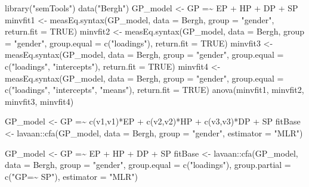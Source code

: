 \documentclass[
]{book}
\newenvironment{Shaded}{\begin{snugshade}}{\end{snugshade}}
\newcommand{\AttributeTok}[1]{\textcolor[rgb]{0.77,0.63,0.00}{#1}}
\newcommand{\ConstantTok}[1]{\textcolor[rgb]{0.00,0.00,0.00}{#1}}
\newcommand{\FunctionTok}[1]{\textcolor[rgb]{0.00,0.00,0.00}{#1}}
\newcommand{\NormalTok}[1]{#1}
\newcommand{\OtherTok}[1]{\textcolor[rgb]{0.56,0.35,0.01}{#1}}
\newcommand{\SpecialCharTok}[1]{\textcolor[rgb]{0.00,0.00,0.00}{#1}}
\newcommand{\StringTok}[1]{\textcolor[rgb]{0.31,0.60,0.02}{#1}}
\begin{document}
\begin{Shaded}
\begin{Highlighting}[]
\FunctionTok{library}\NormalTok{(}\StringTok{"semTools"}\NormalTok{)}
\FunctionTok{data}\NormalTok{(}\StringTok{"Bergh"}\NormalTok{)}
\NormalTok{GP\_model }\OtherTok{\textless{}{-}} \StringTok{\textquotesingle{}GP =\textasciitilde{} EP + HP + DP + SP\textquotesingle{}}
\NormalTok{minvfit1 }\OtherTok{\textless{}{-}} \FunctionTok{measEq.syntax}\NormalTok{(GP\_model, }\AttributeTok{data =}\NormalTok{ Bergh, }\AttributeTok{group =} \StringTok{"gender"}\NormalTok{, }\AttributeTok{return.fit =} \ConstantTok{TRUE}\NormalTok{)}
\NormalTok{minvfit2 }\OtherTok{\textless{}{-}} \FunctionTok{measEq.syntax}\NormalTok{(GP\_model, }\AttributeTok{data =}\NormalTok{ Bergh, }\AttributeTok{group =} \StringTok{"gender"}\NormalTok{, }
                          \AttributeTok{group.equal =} \FunctionTok{c}\NormalTok{(}\StringTok{"loadings"}\NormalTok{), }\AttributeTok{return.fit =} \ConstantTok{TRUE}\NormalTok{)}
\NormalTok{minvfit3 }\OtherTok{\textless{}{-}} \FunctionTok{measEq.syntax}\NormalTok{(GP\_model, }\AttributeTok{data =}\NormalTok{ Bergh, }\AttributeTok{group =} \StringTok{"gender"}\NormalTok{, }
                          \AttributeTok{group.equal =} \FunctionTok{c}\NormalTok{(}\StringTok{"loadings"}\NormalTok{, }\StringTok{"intercepts"}\NormalTok{), }\AttributeTok{return.fit =} \ConstantTok{TRUE}\NormalTok{)}
\NormalTok{minvfit4 }\OtherTok{\textless{}{-}} \FunctionTok{measEq.syntax}\NormalTok{(GP\_model, }\AttributeTok{data =}\NormalTok{ Bergh, }\AttributeTok{group =} \StringTok{"gender"}\NormalTok{, }
                          \AttributeTok{group.equal =} \FunctionTok{c}\NormalTok{(}\StringTok{"loadings"}\NormalTok{, }\StringTok{"intercepts"}\NormalTok{, }\StringTok{"means"}\NormalTok{), }\AttributeTok{return.fit =} \ConstantTok{TRUE}\NormalTok{)}
\FunctionTok{anova}\NormalTok{(minvfit1, minvfit2, minvfit3, minvfit4)}

\NormalTok{GP\_model }\OtherTok{\textless{}{-}} \StringTok{\textquotesingle{}GP =\textasciitilde{} c(v1,v1)*EP + c(v2,v2)*HP + c(v3,v3)*DP + SP\textquotesingle{}}
\NormalTok{fitBase }\OtherTok{\textless{}{-}}\NormalTok{ lavaan}\SpecialCharTok{::}\FunctionTok{cfa}\NormalTok{(GP\_model, }\AttributeTok{data =}\NormalTok{ Bergh, }\AttributeTok{group =} \StringTok{"gender"}\NormalTok{, }\AttributeTok{estimator =} \StringTok{"MLR"}\NormalTok{)}

\NormalTok{GP\_model }\OtherTok{\textless{}{-}} \StringTok{\textquotesingle{}GP =\textasciitilde{} EP + HP + DP + SP\textquotesingle{}}
\NormalTok{fitBase }\OtherTok{\textless{}{-}}\NormalTok{ lavaan}\SpecialCharTok{::}\FunctionTok{cfa}\NormalTok{(GP\_model, }\AttributeTok{data =}\NormalTok{ Bergh, }\AttributeTok{group =} \StringTok{"gender"}\NormalTok{, }\AttributeTok{group.equal =} \FunctionTok{c}\NormalTok{(}\StringTok{"loadings"}\NormalTok{),}
                       \AttributeTok{group.partial =} \FunctionTok{c}\NormalTok{(}\StringTok{"GP=\textasciitilde{} SP"}\NormalTok{), }\AttributeTok{estimator =} \StringTok{"MLR"}\NormalTok{)}


\end{Highlighting}
\end{Shaded}
\end{document}
